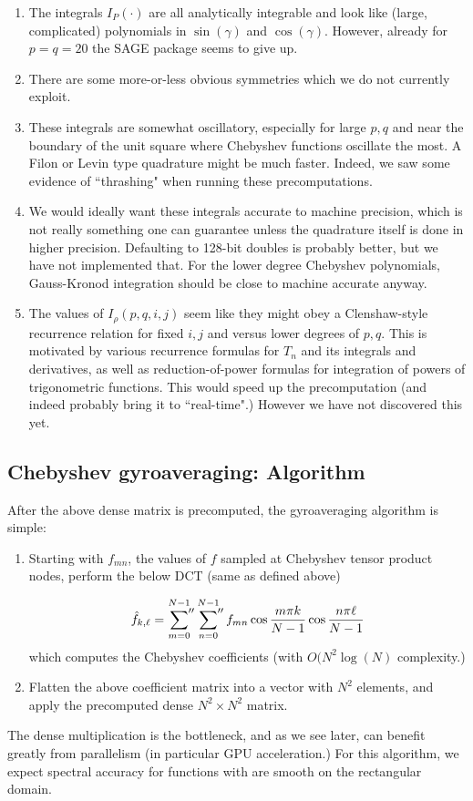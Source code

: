 \begin{enumerate}
	\item The integrals $I_P(\cdot)$ are all analytically integrable and look like (large, complicated) polynomials in $\sin(\gamma)$ and $\cos(\gamma)$.  However, already for $p=q=20$ the SAGE package seems to give up.
	\item There are some more-or-less obvious symmetries which we do not currently exploit.
	\item These integrals are somewhat oscillatory, especially for large $p,q$ and near the boundary of the unit square where Chebyshev functions oscillate the most. A Filon or Levin type quadrature might be much faster.  Indeed, we saw some evidence of ``thrashing" when running these precomputations.
	\item We would ideally want these integrals accurate to machine precision, which is not really something one can guarantee unless the quadrature itself is done in higher precision.  Defaulting to 128-bit doubles is probably better, but we have not implemented that.  For the lower degree Chebyshev polynomials, Gauss-Kronod integration should be close to machine accurate anyway.
	\item The values of $I_{\rho}(p,q,i,j)$ seem like they might obey a Clenshaw-style recurrence relation for fixed $i,j$ and versus lower degrees of $p,q$.  This is motivated by various recurrence formulas for $T_n$ and its integrals and derivatives, as well as reduction-of-power formulas for integration of powers of trigonometric functions.  This would speed up the precomputation (and indeed probably bring it to ``real-time".)  However we have not discovered this yet.
\end{enumerate}

\subsection{Chebyshev gyroaveraging: Algorithm }
After the above dense matrix is precomputed, the gyroaveraging algorithm is simple:
\begin{enumerate}
	\item Starting with $f_{mn}$, the values of $f$ sampled at Chebyshev tensor product nodes, perform the below DCT (same as defined above) 
	
	\[ \hat{f}_{k,\ell} = \sideset{}{''}\sum_{m=0}^{N-1} \sideset{}{''}\sum_{n=0}^{N-1}f_{mn} \cos \frac{m \pi k}{N-1} \cos \frac{n \pi \ell}{N-1} \]
	which computes the Chebyshev coefficients (with $O(N^2 \log(N)$ complexity.)
	\item Flatten the above coefficient matrix into a vector with $N^2$ elements, and apply the precomputed dense $N^2 \times N^2$ matrix.
\end{enumerate}
 The dense multiplication is the bottleneck, and as we see later, can benefit greatly from parallelism (in particular GPU acceleration.)  For this algorithm, we expect spectral accuracy for functions with are smooth on the rectangular domain.

 